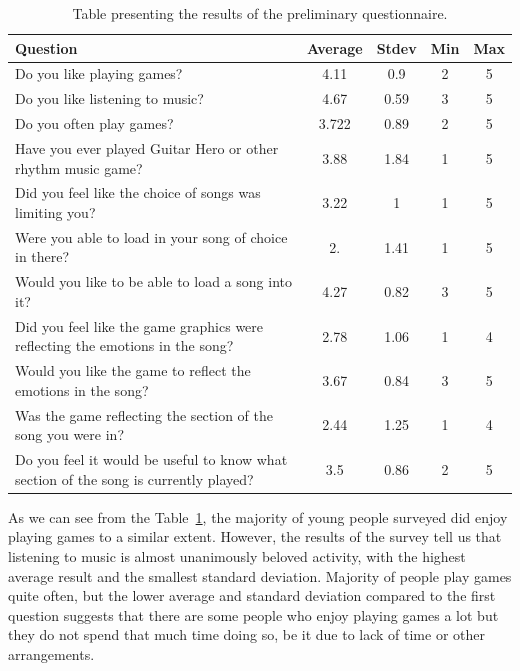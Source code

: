 \begin{table}
\begin{center}
\begin{tabular}{| p{8cm} | c | c | c | c | } 																								      \hline 
\textbf{Question} & \textbf{Average} & \textbf{Stdev} & \textbf{Min} & \textbf{Max} 						   \\ \hline \hline
Do you like playing games? & 4.11 & 0.9 & 2 & 5		 					 					 									\\ \hline 
Do you like listening to music? & 4.67 & 0.59 & 3 & 5		 					 					 								\\ \hline 
Do you often play games? & 3.722 & 0.89 & 2 & 5 		 					 					 								\\ \hline 
Have you ever played Guitar Hero or other rhythm music game? & 3.88 & 1.84  & 1 & 5							\\ \hline 
Did you feel like the choice of songs was limiting you? & 3.22 & 1 & 1 & 5 					 							\\ \hline 
Were you able to load in your song of choice in there? & 2. & 1.41 & 1 & 5 					 							\\ \hline 
Would you like to be able to load a song into it? & 4.27 & 0.82 & 3 & 5 				 									\\ \hline 
Did you feel like the game graphics were reflecting the emotions in the song? & 2.78 & 1.06 & 1 & 4 			\\ \hline 
Would you like the game to reflect the emotions in the song? & 3.67 & 0.84 & 3 & 5 	 								\\ \hline 
Was the game reflecting the section of the song you were in? & 2.44 & 1.25 & 1 & 4  								\\ \hline 
Do you feel it would be useful to know what section of the song is currently played? & 3.5 & 0.86 & 2 & 5  	\\ \hline 
\end{tabular}
\caption{Table presenting the results of the preliminary questionnaire.}
\label{table:preliminaryquestions}
\end{center}
\end{table}

As we can see from the Table~\ref{table:preliminaryquestions}, the majority of young people surveyed did enjoy playing games to a similar extent. However, the results of the survey tell us that listening to music is almost unanimously beloved activity, with the highest average result and the smallest standard deviation. 
Majority of people play games quite often, but the lower average and standard deviation compared to the first question suggests that there are some people who enjoy playing games a lot but they do not spend that much time doing so, be it due to lack of time or other arrangements. 


